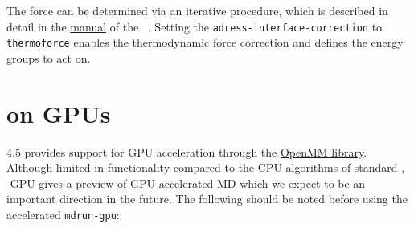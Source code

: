 The force can be determined via an iterative procedure, which is described in detail in the \href{http://code.google.com/p/votca/downloads/list?&q=manual}{manual} of the ~\cite{ruehle2009}. Setting the {\tt adress-interface-correction} to {\tt thermoforce} enables the thermodynamic force correction and defines the energy groups to act on.

\section{{\gromacs} on GPUs}

{\gromacs} 4.5 provides support for GPU acceleration through 
the \href{https://simtk.org/home/openmm}{OpenMM library}. 
Although limited in functionality compared to the CPU algorithms of standard {\gromacs},
{\gromacs}-GPU gives a preview of GPU-accelerated MD which we expect to be an important direction in the future. 
The following should be noted before using the accelerated {\tt mdrun-gpu}:
